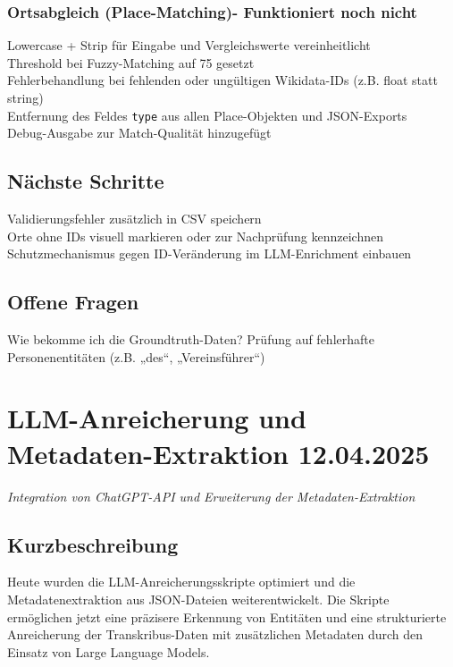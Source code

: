 \documentclass{article}
\begin{document}
\subsubsection*{\small Ortsabgleich (Place-Matching)- Funktioniert noch nicht}
 Lowercase + Strip für Eingabe und Vergleichswerte vereinheitlicht\\
 Threshold bei Fuzzy-Matching auf 75 gesetzt\\
 Fehlerbehandlung bei fehlenden oder ungültigen Wikidata-IDs (z.B. float statt string)\\
 Entfernung des Feldes \texttt{type} aus allen Place-Objekten und JSON-Exports\\
 Debug-Ausgabe zur Match-Qualität hinzugefügt

\subsection*{Nächste Schritte}
 Validierungsfehler zusätzlich in CSV speichern\\
 Orte ohne IDs visuell markieren oder zur Nachprüfung kennzeichnen\\
 Schutzmechanismus gegen ID-Veränderung im LLM-Enrichment einbauen

\subsection*{Offene Fragen}
 Wie bekomme ich die Groundtruth-Daten?
 Prüfung auf fehlerhafte Personenentitäten (z.B. „des“, „Vereinsführer“)\\




\noindent\hrulefill

\section{LLM-Anreicherung und Metadaten-Extraktion \small 12.04.2025}
\small\textit{Integration von ChatGPT-API und Erweiterung der Metadaten-Extraktion}\\
\subsection*{Kurzbeschreibung}

Heute wurden die LLM-Anreicherungsskripte optimiert und die Metadatenextraktion aus JSON-Dateien weiterentwickelt. Die Skripte ermöglichen jetzt eine präzisere Erkennung von Entitäten und eine strukturierte Anreicherung der Transkribus-Daten mit zusätzlichen Metadaten durch den Einsatz von Large Language Models.
\end{document}
